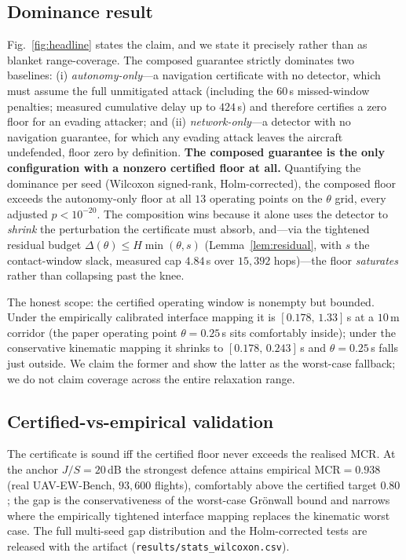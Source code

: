\documentclass[conference]{IEEEtran}
\newcommand{\code}[1]{\texttt{#1}}
\begin{document}
\subsection{Dominance result}
Fig.~\ref{fig:headline} states the claim, and we state it precisely rather than
as blanket range-coverage. The composed guarantee strictly dominates two
baselines: (i) \emph{autonomy-only}---a navigation certificate with no detector,
which must assume the full unmitigated attack (including the $60$\,s
missed-window penalties; measured cumulative delay up to $424$\,s) and therefore
certifies a zero floor for an evading attacker; and (ii) \emph{network-only}---a
detector with no navigation guarantee, for which any evading attack leaves the
aircraft undefended, floor zero by definition. \textbf{The composed guarantee is
the only configuration with a nonzero certified floor at all.} Quantifying the
dominance per seed (Wilcoxon signed-rank, Holm-corrected), the composed floor
exceeds the autonomy-only floor at all $13$ operating points on the $\theta$
grid, every adjusted $p<10^{-20}$. The composition wins because it alone uses the
detector to \emph{shrink} the perturbation the certificate must absorb, and---via
the tightened residual budget $\Delta(\theta)\le H\min(\theta,s)$
(Lemma~\ref{lem:residual}, with $s$ the contact-window slack, measured cap
$4.84$\,s over $15{,}392$ hops)---the floor \emph{saturates} rather than
collapsing past the knee.

The honest scope: the certified operating window is nonempty but bounded. Under
the empirically calibrated interface mapping it is $[0.178,\,1.33]$\,s at a
$10$\,m corridor (the paper operating point $\theta=0.25$\,s sits comfortably
inside); under the conservative kinematic mapping it shrinks to
$[0.178,\,0.243]$\,s and $\theta=0.25$\,s falls just outside. We claim the
former and show the latter as the worst-case fallback; we do not claim coverage
across the entire relaxation range.

\subsection{Certified-vs-empirical validation}
The certificate is sound iff the certified floor never exceeds the realised MCR.
At the anchor $J/S=20$\,dB the strongest defence attains empirical
$\text{MCR}=0.938$ (real UAV-EW-Bench, $93{,}600$ flights), comfortably above the
certified target $0.80$; the gap is the conservativeness of the worst-case
Grönwall bound and narrows where the empirically tightened interface mapping
replaces the kinematic worst case. The full multi-seed gap distribution and the
Holm-corrected tests are released with the artifact
(\code{results/stats\_wilcoxon.csv}).
\end{document}
